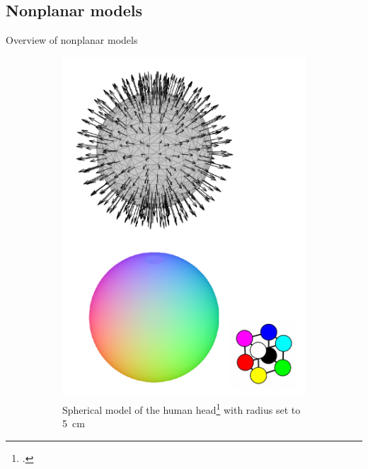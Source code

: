 \documentclass[xcolor=dvipsnames,10pt]{beamer}
\begin{document}
\subsection{Nonplanar models}
\begin{frame}{Overview of nonplanar models}        
    \begin{figure}
     \centering
     \begin{subfigure}[b]{0.31\textwidth}
         \centering
         \includegraphics[width=\textwidth]{artwork/canonical_tissue_model.sphere.pdf}
         \caption{Spherical model of the human head\footcite{Kapetanovic2022Assessment} with radius set to \SI{5}{\cm}}
     \end{subfigure}
     \hfill
     \begin{subfigure}[b]{0.31\textwidth}
         \centering

\end{subfigure}
\end{figure}
\end{frame}
\end{document}
